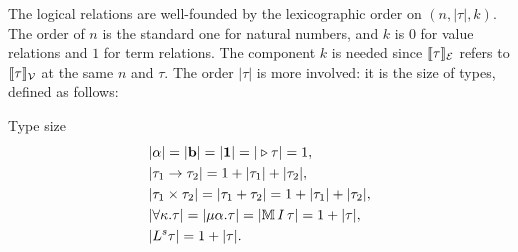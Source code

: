 The logical relations are well-founded by the lexicographic order on $(n, |\tau|, k)$. The order of $n$ is the standard one for natural numbers,
and $k$ is $0$ for value relations and $1$ for term relations.
The component $k$ is needed since $\llbracket \tau \rrbracket_{\mathcal{E}}$ refers to $\llbracket \tau \rrbracket_{\mathcal{V}}$ at the same $n$ and $\tau$.
The order $|\tau|$ is more involved: it is the size of types, defined as follows:

\begin{defn}{Type size}
\label{def:worst-case-ty-size}
  \begin{align*}
    &|\alpha|=|\textbf{b}|=|\textbf{1}|=|\triangleright\tau|=1, \\
    &|\tau_1\to\tau_2|=1+|\tau_1|+|\tau_2|, \\
    &|\tau_1\times\tau_2|=|\tau_1+\tau_2|
      =1+|\tau_1|+|\tau_2|, \\
    &|\forall\kappa.\tau|=|\mu\alpha.\tau|=|\mathbb{M}\,{ I}\, \tau|=1+|\tau|, \\
    &|L^s\tau|=1+|\tau|.
  \end{align*}
\end{defn}

